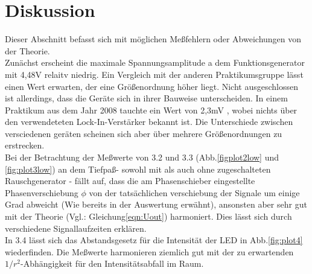 \section{Diskussion}
\label{sec:Diskussion}
Dieser Abschnitt befasst sich mit möglichen Meßfehlern oder Abweichungen
von der Theorie.\\

Zunächst erscheint die maximale Spannungsamplitude a dem Funktionsgenerator mit
4,48V relaitv niedrig. Ein Vergleich mit der anderen Praktikumsgruppe lässt
einen Wert erwarten, der eine Größenordnung höher liegt. Nicht ausgeschlossen
ist allerdings, dass die Geräte sich in ihrer Bauweise unterscheiden. In
einem Praktikum aus dem Jahr 2008 tauchte ein Wert von 2,3mV , wobei nichts
über den verwendeteten Lock-In-Verstärker bekannt ist. Die Unterschiede
zwischen versciedenen geräten scheinen sich aber über mehrere Größenordnungen
zu erstrecken.\\

Bei der Betrachtung der Meßwerte von 3.2 und 3.3 (Abb.\ref{figplot2low} und
\ref{fig:plot3low})
an dem Tiefpaß- sowohl mit als auch ohne zugeschalteten
Rauschgenerator - fällt auf, dass die am Phasenschieber eingestellte
Phasenverschiebung $\phi$ von der tatsächlichen verschiebung der Signale
um einige Grad abweicht (Wie bereits in der Auswertung erwähnt), ansonsten
aber sehr gut mit der Theorie (Vgl.: Gleichung\ref{eqn:Uout}) harmoniert.
Dies lässt sich durch verschiedene Signallaufzeiten erklären.\\

In 3.4 lässt sich das Abstandsgesetz für die Intensität der LED in
Abb.\ref{fig:plot4} wiederfinden. Die Meßwerte harmonieren ziemlich gut mit der
zu erwartenden $1/r^2$-Abhängigkeit für den Intensitätsabfall im Raum.
